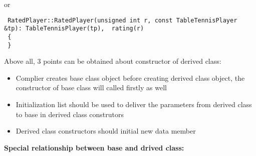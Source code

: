 \documentclass[10pt,a4paper,oneside]{article}
\begin{document}
 or
 \begin{lstlisting}
 RatedPlayer::RatedPlayer(unsigned int r, const TableTennisPlayer &tp): TableTennisPlayer(tp),  rating(r)
 {
 }
 \end{lstlisting}
 Above all, 3 points can be obtained about constructor of derived class:
 \begin{itemize}
 \item Complier creates base class object before creating derived class object, the constructor of base class will called firstly as well
 \item Initialization list should be used to deliver the parameters from derived class to base in derived class construtors
 \item Derived class constructors should initial new data member
 \end{itemize}
{\bfseries Special relationship between base and drived class:}
\end{document}
